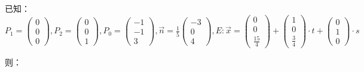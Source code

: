 \documentclass[fleqn]{article}
\begin{document}
已知：$P_1=\begin{pmatrix}
    0\\0\\0
\end{pmatrix},P_2=\begin{pmatrix}
    0\\0\\1
\end{pmatrix},P_0=\begin{pmatrix}
    -1\\-1\\3
\end{pmatrix},\vec{n}=\frac{1}{5}\begin{pmatrix}
    -3\\0\\4
\end{pmatrix},E:\vec{x}=\begin{pmatrix}
    0\\0\\\frac{15}{4}
\end{pmatrix}+\begin{pmatrix}
    1\\0\\\frac{3}{4}
\end{pmatrix}\cdot t+\begin{pmatrix}
    0\\1\\0
\end{pmatrix}\cdot s$

则：
\end{document}

